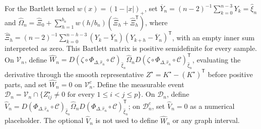 For the Bartlett kernel \(w(x)=(1-|x|)_+\), set \(\overline Y_n=(n-2)^{-1}\sum_{k=0}^{n-3}Y_k=\widehat\xi_n\) and \(\widehat\Omega_n=\widehat\Xi_0+\sum_{h=1}^{b_n}w(h/b_n)(\widehat\Xi_h+\widehat\Xi_h^{\mathsf T})\), where \(\widehat\Xi_h=(n-2)^{-1}\sum_{k=0}^{n-h-3}(Y_k-\overline Y_n)(Y_{k+h}-\overline Y_n)^{\mathsf T}\), with an empty inner sum interpreted as zero. This Bartlett matrix is positive semidefinite for every sample. On \(\mathcal V_n\), define \(\widehat W_n=D(\zeta\circ\Phi_{\Delta,\widehat r_n}\circ\mathcal C)_{\widehat\xi_n}\widehat\Omega_nD(\zeta\circ\Phi_{\Delta,\widehat r_n}\circ\mathcal C)_{\widehat\xi_n}^{\mathsf T}\), evaluating the derivative through the smooth representative \(Z^\star=K^\star-(K^\star)^{\mathsf T}\) before positive parts, and set \(\widehat W_n=0\) on \(\mathcal V_n^c\). Define the measurable event \(\mathcal D_n=\mathcal V_n\cap\{Z_{ij}^\star\neq0\text{ for every }1\leq i<j\leq p\}\). On \(\mathcal D_n\), define \(\widehat V_n=D(\Phi_{\Delta,\widehat r_n}\circ\mathcal C)_{\widehat\xi_n}\widehat\Omega_nD(\Phi_{\Delta,\widehat r_n}\circ\mathcal C)_{\widehat\xi_n}^{\mathsf T}\); on \(\mathcal D_n^c\), set \(\widehat V_n=0\) as a numerical placeholder. The optional \(\widehat V_n\) is not used to define \(\widehat W_n\) or any graph interval.